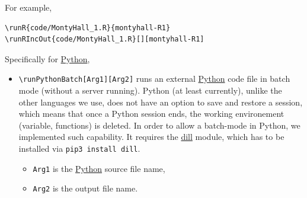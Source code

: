 \documentclass{ltxdoc}
\begin{document}
For example,
\begin{verbatim}
\runR{code/MontyHall_1.R}{montyhall-R1}
\runRIncOut{code/MontyHall_1.R}[][montyhall-R1]
\end{verbatim}

Specifically for \href{https://www.python.org/}{Python}, 

\begin{itemize}
\item \texttt{\textbackslash{}runPythonBatch[Arg1][Arg2]} runs an external \href{https://www.python.org/}{Python} code file in batch mode
(without a server running). Python (at least currently), unlike the other
languages we use, does not have an option to save and restore a session, which
means that once a Python session ends, the working environement (variable,
functions) is deleted. In order to allow a batch-mode in Python, we
implemented such capability. It requires the \href{https://pypi.org/project/dill/}{dill} module, which has to be
installed via \texttt{pip3 install dill}.
\begin{itemize}
\item \texttt{Arg1} is the \href{https://www.python.org/}{Python} source file name,
\item \texttt{Arg2} is the output file name.
\end{itemize}
\end{itemize}
\end{document}

